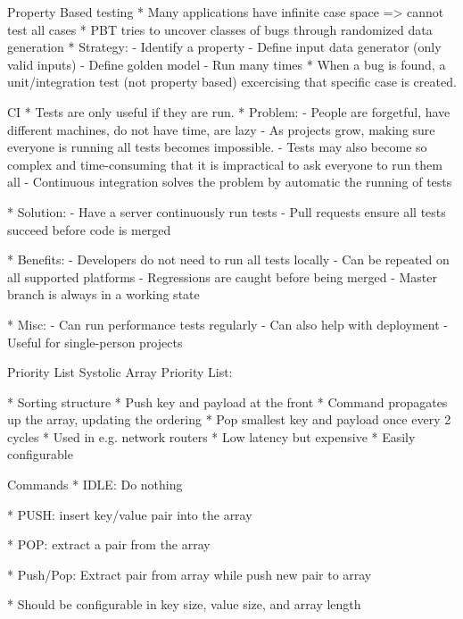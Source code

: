 \begin{frame}[fragile]{Property Based testing}
	* Many applications have infinite case space => cannot test all cases
	* PBT tries to uncover classes of bugs through randomized data generation
	* Strategy:
		- Identify a property
		- Define input data generator (only valid inputs)
		- Define golden model
		- Run many times
	* When a bug is found, a unit/integration test (not property based) excercising that specific case is created.
	
\end{frame}


\begin{frame}[fragile]{CI}
	* Tests are only useful if they are run.
	* Problem: 
		- People are forgetful, have different machines, do not have time, are lazy
		- As projects grow, making sure everyone is running all tests becomes impossible.
		- Tests may also become so complex and time-consuming that it is impractical to ask everyone to run them all
		- Continuous integration solves the problem by automatic the running of tests
	
	* Solution:
		- Have a server continuously run tests
		- Pull requests ensure all tests succeed before code is merged
	
	* Benefits:
		- Developers do not need to run all tests locally
		- Can be repeated on all supported platforms
		- Regressions are caught before being merged
		- Master branch is always in a working state
	
	* Misc:
		- Can run performance tests regularly
		- Can also help with deployment
		- Useful for single-person projects

\end{frame}


\begin{frame}[fragile]{Priority List}
	Systolic Array Priority List:
	
	* Sorting structure
	* Push key and payload at the front
	* Command propagates up the array, updating the ordering
	* Pop smallest key and payload once every 2 cycles
	* Used in e.g. network routers
	* Low latency but expensive
	* Easily configurable
\end{frame}


\begin{frame}[fragile]{Commands}
	* IDLE: Do nothing
	
	* PUSH: insert key/value pair into the array
	
	* POP: extract a pair from the array
	
	* Push/Pop: Extract pair from array while push new pair to array
	
	* Should be configurable in key size, value size, and array length	
	
\end{frame}


